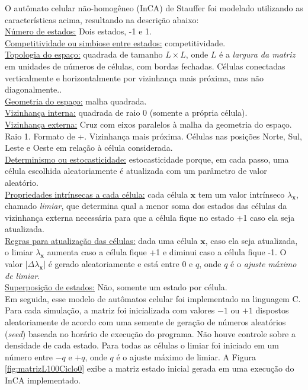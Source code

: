 \documentclass[
	12pt,				%
	openright,			%
	twoside,			%
	a4paper,			%
	english,			%
	french,				%
	spanish,			%
	brazil				%
	]{abntex2}
\begin{document}
O autômato celular não-homogêneo (InCA) de Stauffer foi modelado utilizando as características acima, resultando na descrição abaixo:\\
\underline{Número de estados:} Dois estados, -1 e 1.\\
\underline{Competitividade ou simbiose entre estados:} competitividade.\\
\underline{Topologia do espaço:} quadrada de tamanho $L\times L$, onde $L$ é a \textit{largura da matriz} em unidades de números de células, com bordas fechadas. Células conectadas verticalmente e horizontalmente por vizinhança mais próxima, mas não diagonalmente..\\
\underline{Geometria do espaço:} malha quadrada.\\
\underline{Vizinhança interna:} quadrada de raio 0 (somente a própria célula).\\
\underline{Vizinhança externa:} Cruz com eixos paralelos à malha da geometria do espaço. Raio 1. Formato de +. Vizinhança mais próxima. Células nas posições Norte, Sul, Leste e Oeste em relação à célula considerada.\\
\underline{Determinismo ou estocasticidade:} estocasticidade porque, em cada passo, uma célula escolhida aleatoriamente é atualizada com um parâmetro de valor aleatório.\\
\underline{Propriedades intrínsecas a cada célula:} cada célula $\mathbf{x}$ tem um valor intrínseco $\lambda_\mathbf{x}$, chamado \textit{limiar}, que determina qual a menor soma dos estados das células da vizinhança externa necessária para que a célula fique no estado +1 caso ela seja atualizada.\\
\underline{Regras para atualização das células:}  dada uma célula $\mathbf{x}$, caso ela seja atualizada, o limiar $\lambda_\mathbf{x}$ aumenta caso a célula fique +1 e diminui caso a célula fique -1. O valor $|\Delta\lambda_\mathbf{x}|$ é gerado aleatoriamente e está entre $0$ e $q$, onde $q$ é o \textit{ajuste máximo de limiar}.\\
\underline{Superposição de estados:} Não, somente um estado por célula.\\

Em seguida, esse modelo de autômatos celular foi implementado na linguagem C. Para cada simulação, a matriz foi inicializada com valores $-1$ ou $+1$ dispostos aleatoriamente de acordo com uma semente de geração de números aleatórios (\textit{seed}) baseada no horário de execução do programa. Não houve controle sobre a densidade de cada estado. Para todas as células o limiar foi iniciado em um número entre $-q$ e $+q$, onde $q$ é o ajuste máximo de limiar. A Figura \ref{fig:matrizL100Ciclo0} exibe a matriz estado inicial gerada em uma execução do InCA implementado.
\end{document}
